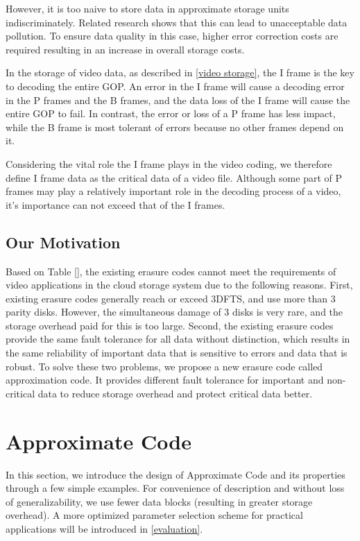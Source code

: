 \documentclass[sigconf]{acmart}
\begin{document}
However, it is too naive to store data in approximate storage units indiscriminately. Related research \cite{guo2016high} shows that this can lead to unacceptable data pollution. To ensure data quality in this case, higher error correction costs are required resulting in an increase in overall storage costs.


In the storage of video data, as described in \ref{video storage}, the I frame is the key to decoding the entire GOP. An error in the I frame will cause a decoding error in the P frames and the B frames, and the data loss of the I frame will cause the entire GOP to fail. In contrast, the error or loss of a P frame has less impact, while the B frame is most tolerant of errors because no other frames depend on it.

Considering the vital role the I frame plays in the video coding, we therefore define I frame data as the critical data of a video file. Although some part of P frames may play a relatively important role in the decoding process of a video, it’s importance can not exceed that of the I frames.


\subsection{Our Motivation}
Based on Table [], the existing erasure codes cannot meet the requirements of video applications in the cloud storage system due to the following reasons. First, existing erasure codes generally reach or exceed 3DFTS, and use more than 3 parity disks. However, the simultaneous damage of 3 disks is very rare, and the storage overhead paid for this is too large. Second, the existing erasure codes provide the same fault tolerance for all data without distinction, which results in the same reliability of important data that is sensitive to errors and data that is robust. To solve these two problems, we propose a new erasure code called approximation code. It provides different fault tolerance for important and non-critical data to reduce storage overhead and protect critical data better.

\section{Approximate Code}\label{ApCode}
In this section, we introduce the design of Approximate Code and its properties through a few simple examples. For convenience of description and without loss of generalizability, we use fewer data blocks (resulting in greater storage overhead). A more optimized parameter selection scheme for practical applications will be introduced in \ref{evaluation}.
\end{document}
